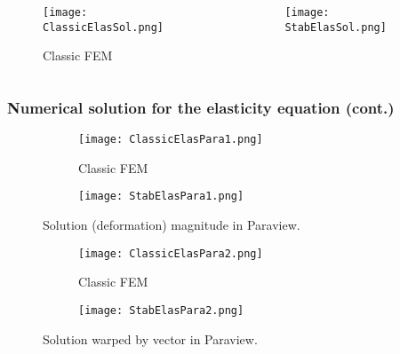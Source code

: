\begin{frame}
\begin{columns}[T]
\begin{column}{.48\textwidth}
        \end{column}%
    \end{columns}

    \pause

    \begin{columns}
        \begin{column}{0.4\textwidth}
            \centering
            \begin{figure}            
            \texttt{[image: ClassicElasSol.png]}
            \caption{Classic FEM}
            \end{figure}
        \end{column}
        \begin{column}{0.4\textwidth}
            \centering
            \begin{figure}            
            \texttt{[image: StabElasSol.png]}
            \caption{\phifem}
            \end{figure}
        \end{column}
    \end{columns}

\end{frame}

\begin{frame}
    \frametitle{Numerical solution for the elasticity equation (cont.)}

    \begin{figure}[H]
        \begin{subfigure}{0.2\textwidth}
            \texttt{[image: ClassicElasPara1.png]}
          \caption{Classic FEM}
        \end{subfigure}
        \begin{subfigure}{0.21\textwidth}
            \texttt{[image: StabElasPara1.png]}
          \caption{\phifem}
        \end{subfigure}
        \caption{Solution (deformation) magnitude in Paraview.}
    \end{figure}
    
    \zerodisplayskips
    \begin{figure}[H]
        \begin{subfigure}{0.2\textwidth}
            \texttt{[image: ClassicElasPara2.png]}
          \caption{Classic FEM}
        \end{subfigure}
        \begin{subfigure}{0.21\textwidth}
            \texttt{[image: StabElasPara2.png]}
          \caption{\phifem}
        \end{subfigure}
        \caption{Solution warped by vector in Paraview.}
    \end{figure}
    
    
\end{frame}

